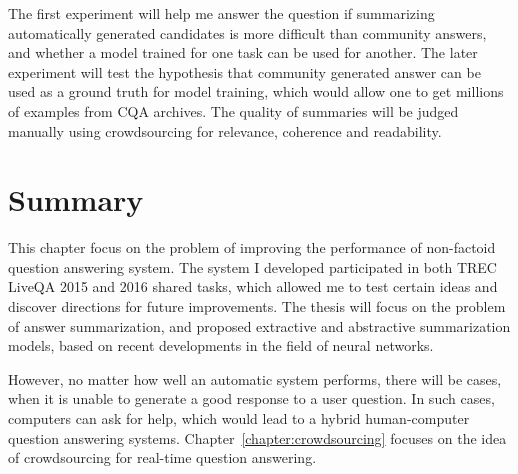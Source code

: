 The first experiment will help me answer the question if summarizing automatically generated candidates is more difficult than community answers, and whether a model trained for one task can be used for another.
The later experiment will test the hypothesis that community generated answer can be used as a ground truth for model training, which would allow one to get millions of examples from CQA archives.
The quality of summaries will be judged manually using crowdsourcing for relevance, coherence and readability.

\section{Summary}
\label{section:non-factoid:summary}

This chapter focus on the problem of improving the performance of non-factoid question answering system.
The system I developed participated in both TREC LiveQA 2015 and 2016 shared tasks, which allowed me to test certain ideas and discover directions for future improvements.
The thesis will focus on the problem of answer summarization, and proposed extractive and abstractive summarization models, based on recent developments in the field of neural networks.

However, no matter how well an automatic system performs, there will be cases, when it is unable to generate a good response to a user question.
In such cases, computers can ask for help, which would lead to a hybrid human-computer question answering systems.
Chapter~\ref{chapter:crowdsourcing} focuses on the idea of crowdsourcing for real-time question answering.